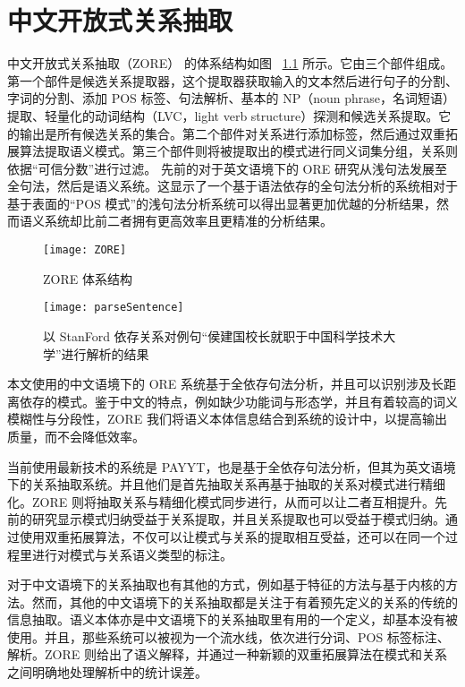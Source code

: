 \chapter{中文开放式关系抽取}
\label{chap:zore}

中文开放式关系抽取（ZORE）\citep{ZORE} 的体系结构如图 ~\ref{fig:ZORE} 所示。它由三个部件组成。第一个部件是候选关系提取器，这个提取器获取输入的文本然后进行句子的分割、字词的分割、添加 POS 标签、句法解析、基本的 NP（noun phrase，名词短语） 提取、轻量化的动词结构（LVC，light verb structure）探测和候选关系提取。它的输出是所有候选关系的集合。第二个部件对关系进行添加标签，然后通过双重拓展算法提取语义模式。第三个部件则将被提取出的模式进行同义词集分组，关系则依据“可信分数”进行过滤。
先前的对于英文语境下的 ORE 研究从浅句法发展至全句法，然后是语义系统。这显示了一个基于语法依存的全句法分析的系统相对于基于表面的“POS 模式”的浅句法分析系统可以得出显著更加优越的分析结果，然而语义系统却比前二者拥有更高效率且更精准的分析结果。

\begin{figure}[h]
\centering
\texttt{[image: ZORE]}
\caption{ZORE 体系结构}\label{fig:ZORE}
\end{figure}

\begin{figure}[h]
\centering
\texttt{[image: parseSentence]}
\caption[句子解析结果]{以 StanFord 依存关系对例句“侯建国校长就职于中国科学技术大学”进行解析的结果}\label{fig:parseSentence}
\end{figure}

本文使用的中文语境下的 ORE 系统基于全依存句法分析，并且可以识别涉及长距离依存的模式。鉴于中文的特点，例如缺少功能词\citep{funcword}与形态学\citep{morphword}，并且有着较高的词义模糊性与分段性，ZORE 我们将语义本体信息结合到系统的设计中，以提高输出质量，而不会降低效率。

当前使用最新技术的系统是 PAYYT\citep{naka2012}，也是基于全依存句法分析，但其为英文语境下的关系抽取系统。并且他们是首先抽取关系再基于抽取的关系对模式进行精细化。ZORE 则将抽取关系与精细化模式同步进行，从而可以让二者互相提升。先前的研究显示模式归纳受益于关系提取\citep{naka2012}，并且关系提取也可以受益于模式归纳\citep{mau2012}。通过使用双重拓展算法，不仅可以让模式与关系的提取相互受益，还可以在同一个过程里进行对模式与关系语义类型的标注。

对于中文语境下的关系抽取也有其他的方式，例如基于特征的方法与基于内核的方法。然而，其他的中文语境下的关系抽取都是关注于有着预先定义的关系的传统的信息抽取。语义本体亦是中文语境下的关系抽取里有用的一个定义，却基本没有被使用。并且，那些系统可以被视为一个流水线，依次进行分词、POS 标签标注、解析。ZORE 则给出了语义解释，并通过一种新颖的双重拓展算法在模式和关系之间明确地处理解析中的统计误差。

